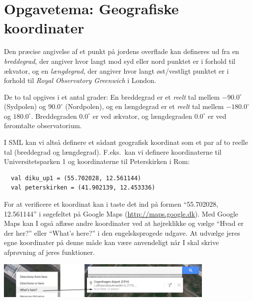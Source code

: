 \documentclass[a4paper,12pt]{article}
\begin{document}
\newpage
\section{Opgavetema: Geografiske koordinater}
Den præcise angivelse af et punkt på jordens overflade kan defineres
ud fra en \textit{breddegrad}, der angiver hvor langt mod syd eller
nord punktet er i forhold til ækvator, og en \textit{længdegrad}, der
angiver hvor langt øst/vestligt punktet er i forhold til \textit{Royal
  Observatory Greenwich} i London.

De to tal opgives i et antal grader: En breddegrad er et
\textit{reelt} tal mellem $-90.0^\circ$ (Sydpolen) og $90.0^\circ$
(Nordpolen), og en længdegrad er et \textit{reelt} tal mellem
$-180.0^\circ$ og $180.0^\circ$. Breddegraden $0.0^\circ$ er ved
ækvator, og længdegraden $0.0^\circ$ er ved føromtalte observatorium.

I SML kan vi altså definere et sådant geografisk koordinat som et par
af to reelle tal (breddegrad og længdegrad).  F.eks.\ kan vi definere
koordinaterne til Universitetsparken 1 og koordinaterne til
Peterskirken i Rom:
\begin{verbatim}
  val diku_up1 = (55.702028, 12.561144)
  val peterskirken = (41.902139, 12.453336)
\end{verbatim}
For at verificere et koordinat kan i taste det ind på formen
"`55.702028, 12.561144"' i søgefeltet på Google Maps
(\url{http://maps.google.dk}). Med Google Maps kan I også aflæse andre
koordinater ved at højreklikke og vælge "`Hvad er der her?"' eller
"`What's here?"' i den engelsksprogede udgave. At udvælge jeres egne
koordinater på denne måde kan være anvendeligt når I skal skrive
afprøvning af jeres funktioner.

\begin{center}
\includegraphics[width=0.8\textwidth]{uge2_googlemaps.png}
\end{center}
\end{document}
